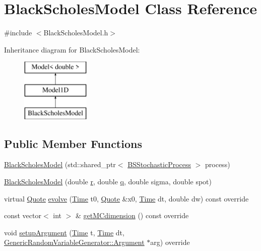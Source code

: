 \hypertarget{class_black_scholes_model}{}\section{Black\+Scholes\+Model Class Reference}
\label{class_black_scholes_model}


{\ttfamily \#include $<$Black\+Scholes\+Model.\+h$>$}

Inheritance diagram for Black\+Scholes\+Model\+:\begin{figure}[H]
\begin{center}
\leavevmode
\includegraphics[height=3.000000cm]{class_black_scholes_model}
\end{center}
\end{figure}
\subsection*{Public Member Functions}
\begin{DoxyCompactItemize}
\item 
\hyperlink{class_black_scholes_model_a5cc9ce0cdb0f040da65677b2c07f09b5}{Black\+Scholes\+Model} (std\+::shared\+\_\+ptr$<$ \hyperlink{class_b_s_stochastic_process}{B\+S\+Stochastic\+Process} $>$ process)
\item 
\hyperlink{class_black_scholes_model_a59aa736bd849bc59fed035f702e9813b}{Black\+Scholes\+Model} (double \hyperlink{_uniform_l_ecuyer_r_n_g1_8cpp_a372556d73d7e403d9b677b89b21ee572}{r}, double \hyperlink{_uniform_l_ecuyer_r_n_g1_8cpp_a5cf10165494588b84d4231e0e8a5b1a9}{q}, double sigma, double spot)
\item 
virtual \hyperlink{_name_def_8h_a642a6c5fd87319d922637de0e0bb0305}{Quote} \hyperlink{class_black_scholes_model_a67c3ed604a6d057112ec7e7a1a3fb301}{evolve} (\hyperlink{_name_def_8h_ac2d3e0ba793497bcca555c7c2cf64ff3}{Time} t0, \hyperlink{_name_def_8h_a642a6c5fd87319d922637de0e0bb0305}{Quote} \&x0, \hyperlink{_name_def_8h_ac2d3e0ba793497bcca555c7c2cf64ff3}{Time} dt, double dw) const override
\item 
const vector$<$ int $>$ \& \hyperlink{class_black_scholes_model_a5665e6ea247e4f243082f5c98bbdbad6}{get\+M\+Cdimension} () const override
\item 
void \hyperlink{class_black_scholes_model_a04a6ba4c59cd70a92dedbeb482e9d5aa}{setup\+Argument} (\hyperlink{_name_def_8h_ac2d3e0ba793497bcca555c7c2cf64ff3}{Time} t, \hyperlink{_name_def_8h_ac2d3e0ba793497bcca555c7c2cf64ff3}{Time} dt, \hyperlink{class_generic_random_variable_generator_1_1_argument}{Generic\+Random\+Variable\+Generator\+::\+Argument} $\ast$arg) override
\end{DoxyCompactItemize}
